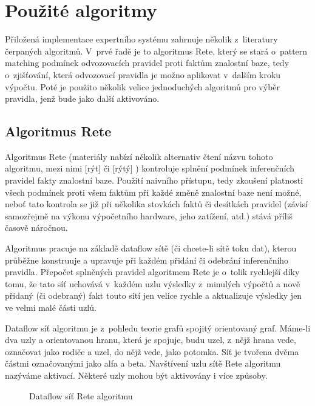 \section{Použité algoritmy}
Přiložená implementace expertního systému zahrnuje několik z~literatury
čerpaných algoritmů. V~prvé řadě je to algoritmus Rete, který se stará o~pattern
matching podmínek odvozovacích pravidel proti faktům znalostní baze, tedy
o~zjišťování, která odvozovací pravidla je možno aplikovat v~dalším kroku výpočtu.
Poté je použito několik velice jednoduchých algoritmů pro výběr pravidla, jenž
bude jako další aktivováno.

\subsection{Algoritmus Rete}

Algoritmus Rete (materiály nabízí několik alternativ čtení názvu tohoto algoritmu,
mezi nimi  [rýt] či  [rýtý] \cite{doorenbos}) kontroluje
splnění podmínek inferenčních pravidel fakty znalostní baze. Použití naivního
přístupu, tedy zkoušení platnosti všech podmínek proti všem faktům při každé
změně znalostní baze není možné, neboť tato kontrola se již při několika stovkách
faktů či desítkách pravidel (závisí samozřejmě na výkonu výpočetního hardware, jeho
zatížení, atd.) stává příliš časově náročnou.

Algoritmus pracuje na základě dataflow sítě (či chcete-li sítě toku dat),
kterou průběžne konstruuje a upravuje při každém přidání či odebrání
inferenčního pravidla. Přepočet splněných pravidel algoritmem Rete je o~tolik
rychlejší díky tomu, že tato síť uchovává v~každém uzlu výsledky z~minulých
výpočtů a nově přidaný (či odebraný) fakt touto sítí jen velice rychle
 a aktualizuje výsledky jen ve velmi malé části uzlů.

Dataflow síť algoritmu je z~pohledu teorie grafů spojitý orientovaný graf.
Máme-li dva uzly a orientovanou hranu, která je spojuje, budu uzel, z~nějž
hrana vede, označovat jako rodiče a uzel, do nějž vede, jako potomka.
Síť je tvořena dvěma částmi označovanými jako alfa a beta. Navštívení uzlu
sítě Rete algoritmu nazýváme aktivací. Některé uzly mohou být aktivovány
i více způsoby.

\begin{figure}[h]
\centerline{}
\caption{Dataflow síť Rete algoritmu\cite{rete}}
\label{network}
\end{figure}

